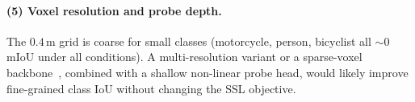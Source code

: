 \paragraph{(5) Voxel resolution and probe depth.}
The $0.4$\,m grid is coarse for small classes (motorcycle, person,
bicyclist all $\sim 0$ mIoU under all conditions). A multi-resolution
variant or a sparse-voxel backbone~\cite{minkowski}, combined with a
shallow non-linear probe head, would likely improve fine-grained class
IoU without changing the SSL objective.
